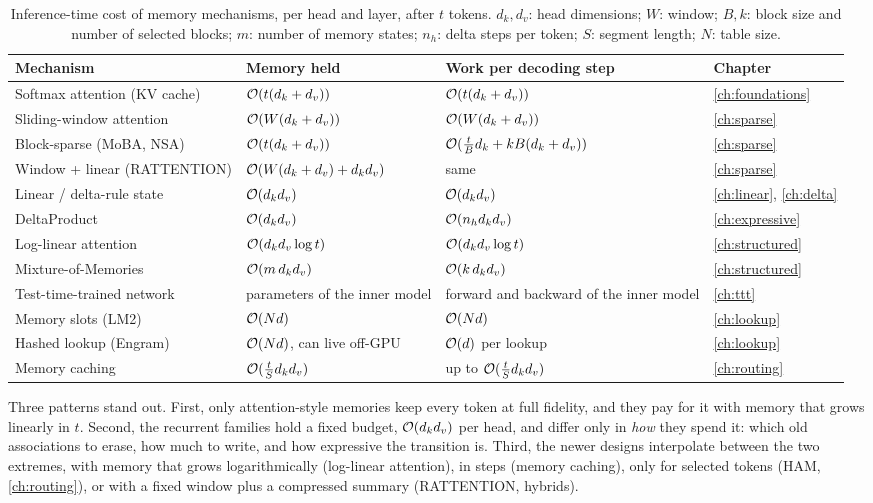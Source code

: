 \begin{table}[t]
\centering\small
\caption{Inference-time cost of memory mechanisms, per head and layer, after $t$ tokens.
$d_k, d_v$: head dimensions; $W$: window; $B, k$: block size and number of selected blocks;
$m$: number of memory states; $n_h$: delta steps per token; $S$: segment length; $N$: table
size.}
\label{tab:c14-costs}
\begin{tabularx}{\textwidth}{@{}lXXl@{}}
\toprule
Mechanism & Memory held & Work per decoding step & Chapter \\
\midrule
Softmax attention (KV cache) & $\mathcal{O}(t(d_k+d_v))$ & $\mathcal{O}(t(d_k+d_v))$ & \ref{ch:foundations} \\
Sliding-window attention & $\mathcal{O}(W(d_k+d_v))$ & $\mathcal{O}(W(d_k+d_v))$ & \ref{ch:sparse} \\
Block-sparse (MoBA, NSA) & $\mathcal{O}(t(d_k+d_v))$ & $\mathcal{O}(\tfrac{t}{B}d_k + kB(d_k+d_v))$ & \ref{ch:sparse} \\
Window + linear (RATTENTION) & $\mathcal{O}(W(d_k+d_v) + d_kd_v)$ & same & \ref{ch:sparse} \\
Linear / delta-rule state & $\mathcal{O}(d_kd_v)$ & $\mathcal{O}(d_kd_v)$ & \ref{ch:linear}, \ref{ch:delta} \\
DeltaProduct & $\mathcal{O}(d_kd_v)$ & $\mathcal{O}(n_h d_kd_v)$ & \ref{ch:expressive} \\
Log-linear attention & $\mathcal{O}(d_kd_v\log t)$ & $\mathcal{O}(d_kd_v\log t)$ & \ref{ch:structured} \\
Mixture-of-Memories & $\mathcal{O}(m\,d_kd_v)$ & $\mathcal{O}(k\,d_kd_v)$ & \ref{ch:structured} \\
Test-time-trained network & parameters of the inner model & forward and backward of the inner model & \ref{ch:ttt} \\
Memory slots (LM2) & $\mathcal{O}(N d)$ & $\mathcal{O}(N d)$ & \ref{ch:lookup} \\
Hashed lookup (Engram) & $\mathcal{O}(N d)$, can live off-GPU & $\mathcal{O}(d)$ per lookup & \ref{ch:lookup} \\
Memory caching & $\mathcal{O}(\tfrac{t}{S}d_kd_v)$ & up to $\mathcal{O}(\tfrac{t}{S}d_kd_v)$ & \ref{ch:routing} \\
\bottomrule
\end{tabularx}
\end{table}

Three patterns stand out. First, only attention-style memories keep every token at full
fidelity, and they pay for it with memory that grows linearly in $t$. Second, the recurrent
families hold a fixed budget, $\mathcal{O}(d_kd_v)$ per head, and differ only in \emph{how} they
spend it: which old associations to erase, how much to write, and how expressive the
transition is. Third, the newer designs interpolate between the two extremes, with memory that
grows logarithmically (log-linear attention), in steps (memory caching), only for selected
tokens (HAM, \cref{ch:routing}), or with a fixed window plus a compressed summary
(RATTENTION, hybrids).

